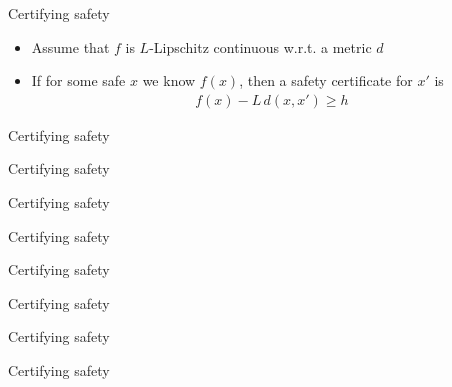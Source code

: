 \documentclass[xetex,10pt,mathserif,handout]{beamer}
\newlength\figureheight
\newlength\figurewidth
\begin{document}
\begin{frame}{Certifying safety}
\begin{itemize}
\item<1-> Assume that $f$ is $L$-Lipschitz continuous w.r.t. a metric $d$
\vspace{2em}
\item<2-> If for some safe $x$ we know $f(x)$, then a safety certificate for $x'$ is
\begin{align*}
f(x) - L\,d(x, x') \geq h
\end{align*}
\end{itemize}
\end{frame}

\begin{frame}{Certifying safety}
\centering
\setlength\figurewidth{5in}
\setlength\figureheight{3.5in}

\end{frame}

\begin{frame}{Certifying safety}
\centering
\setlength\figurewidth{5in}
\setlength\figureheight{3.5in}

\end{frame}

\begin{frame}{Certifying safety}
\centering
\setlength\figurewidth{5in}
\setlength\figureheight{3.5in}

\end{frame}

\begin{frame}{Certifying safety}
\centering
\setlength\figurewidth{5in}
\setlength\figureheight{3.5in}

\end{frame}

\begin{frame}{Certifying safety}
\centering
\setlength\figurewidth{5in}
\setlength\figureheight{3.5in}

\end{frame}

\begin{frame}{Certifying safety}
\centering
\setlength\figurewidth{5in}
\setlength\figureheight{3.5in}

\end{frame}

\begin{frame}{Certifying safety}
\centering
\setlength\figurewidth{5in}
\setlength\figureheight{3.5in}

\end{frame}

\begin{frame}{Certifying safety}
\centering
\setlength\figurewidth{5in}
\setlength\figureheight{3.5in}

\end{frame}
\end{document}
